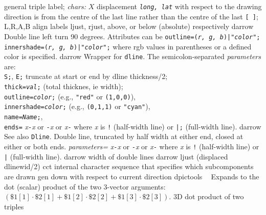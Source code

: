   {general triple label; {\sl chars:}
    $X$ displacement {\tt {\sl long, lat}} with respect to the drawing
      direction is from the centre of the last
      line rather than the centre of the last {\tt [ ]};
    L,R,A,B align labels ljust, rjust, above,
      or below (absolute) respectively  }%
%
  {darrow}%
  {Double line left turn 90 degrees.  Attributes can be
    {\tt outline=({\sl r, g, b})|"{\sl color}";}
    {\tt innershade=({\sl r, g, b})|"{\sl color}";}
    where rgb values in parentheses or a defined color is specified.}%
%
  {darrow}%
  {Wrapper for {\tt dline}.
  The semicolon-separated {\sl parameters} are:\\
    {\tt S;}, {\tt E;} truncate at start or end by dline thickness/2;\\
    {\tt thick={\sl val};}   (total thicknes, ie width);\\
    {\tt outline={\sl color};} (e.g., {\tt "red"} or {\tt (1,0,0)}),\\
    {\tt innershade={\sl color};} (e.g., {\tt (0,1,1)} or {\tt "cyan"}),\\
    {\tt name={\sl Name};},\\
    {\tt ends=}%
      {\sl x}{\tt -}{\sl x} or
      {\tt -}{\sl x} or
      {\sl x}{\tt -} where {\sl x} is {\tt !} (half-width line)
       or {\tt |;} (full-width line).}%
%
  {darrow}%
  {See also {\tt Dline}.
   Double line, truncated by half width at either end, closed
    at either or both ends.
   {\sl parameters=}
      {\sl x}{\tt -}{\sl x} or
      {\tt -}{\sl x} or
      {\sl x}{\tt -} where {\sl x} is {\tt !} (half-width line)
       or {\tt |} (full-width line).}%
%
  {darrow}%
  {width of double lines}%
%
  {darrow}%
  {ljust (displaced dlinewid/2)}%
%
  {cct}%
  {internal character sequence that specifies which subcomponents are drawn}%
%
  {gen}%
  {down with respect to current direction}%
%
  {dpictools}%
  {$\;\;$ Expands to the dot (scalar) product of the two 3-vector arguments:
   $(\${}1[1]\cdot\${}2[1] + \${}1[2]\cdot\${}2[2] + \${}1[3]\cdot\${}2[3])$.}%
%
  {3D}%
  {dot product of two triples}%
